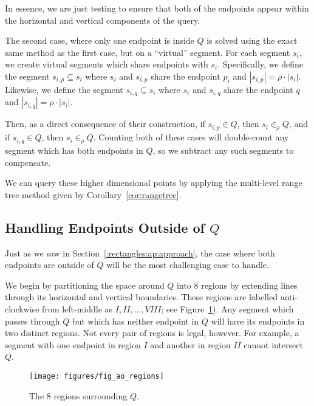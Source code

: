 In essence, we are just testing to ensure that both of the endpoints appear within the horizontal and vertical components of the query.

The second case, where only one endpoint is inside $Q$ is solved using the exact same method as the first case, but on a ``virtual'' segment.  For each segment $s_i$, we create virtual segments which share endpoints with $s_i$.  Specifically, we define the segment $s_{i,p} \subseteq s_i$ where $s_i$ and $s_{i,p}$ share the endpoint $p_i$ and $|s_{i,p}| = \rho \cdot |s_i|$. Likewise, we define the segment $s_{i,q} \subseteq s_i$ where $s_i$ and $s_{i,q}$ share the endpoint $q$ and $|s_{i,q}| = \rho \cdot |s_i|$.

Then, as a direct consequence of their construction, if $s_{i,p} \in Q$, then $s_i \in_\rho Q$, and if $s_{i,q} \in Q$, then $s_i \in_\rho Q$.  Counting both of these cases will double-count any segment which has both endpoints in $Q$, so we subtract any such segments to compensate.

We can query these higher dimensional points by applying the multi-level range tree method given by Corollary~\ref{cor:rangetree}.


\subsection{Handling Endpoints Outside of $Q$}
\label{:rectangles:ao:bothout}

Just as we saw in Section~\ref{:rectangles:ap:approach}, the case where both endpoints are outside of $Q$ will be the most challenging case to handle.

We begin by partitioning the space around $Q$ into 8 regions by extending lines through its horizontal and vertical boundaries. These regions are labelled anti-clockwise from left-middle as $I, II, \ldots, VIII$; see Figure~\ref{fig:rectangles:ao:regions}). Any segment which passes through $Q$ but which has neither endpoint in $Q$ will have its endpoints in two distinct regions. Not every pair of regions is legal, however. For example, a segment with one endpoint in region $I$ and another in region $II$ cannot intersect $Q$.

\begin{figure}[t]
\begin{center}
  \texttt{[image: figures/fig\_ao\_regions]}
  \caption{The 8 regions surrounding $Q$.}
  \label{fig:rectangles:ao:regions}
\end{center}
\end{figure}

